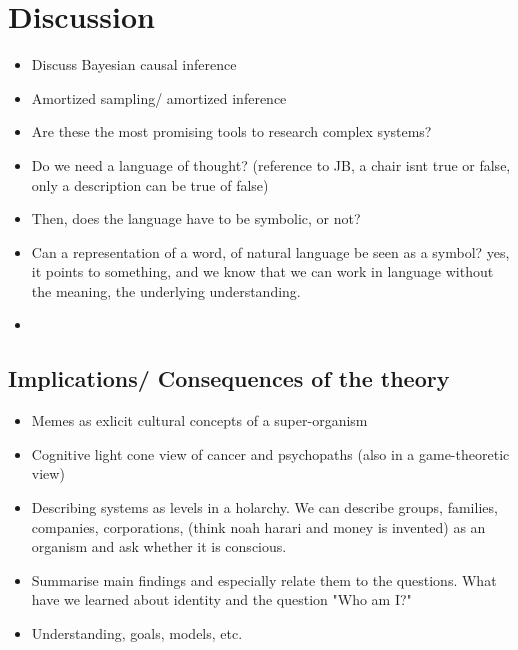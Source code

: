 \chapter{Discussion}

\begin{itemize}
    \item Discuss Bayesian causal inference
    \item Amortized sampling/ amortized inference
    \item Are these the most promising tools to research complex systems?
    \item Do we need a language of thought? (reference to JB, a chair isnt true or false, only a description can be true of false)
    \item Then, does the language have to be symbolic, or not? 
    \item Can a representation of a word, of natural language be seen as a symbol? yes, it points to something, and we know that we can work in language without the meaning, the underlying understanding. 
    \item 
\end{itemize}

\section{Implications/ Consequences of the theory}
\begin{itemize}
    \item Memes as exlicit cultural concepts of a super-organism
    \item Cognitive light cone view of cancer and psychopaths (also in a game-theoretic view)
    \item Describing systems as levels in a holarchy. We can describe groups, families, companies, corporations, (think noah harari and money is invented) as an organism and ask whether it is conscious. 
\end{itemize}

\begin{itemize}
    \item Summarise main findings and especially relate them to the questions. What have we learned about identity and the question "Who am I?"
    \item Understanding, goals, models, etc. 
\end{itemize}
